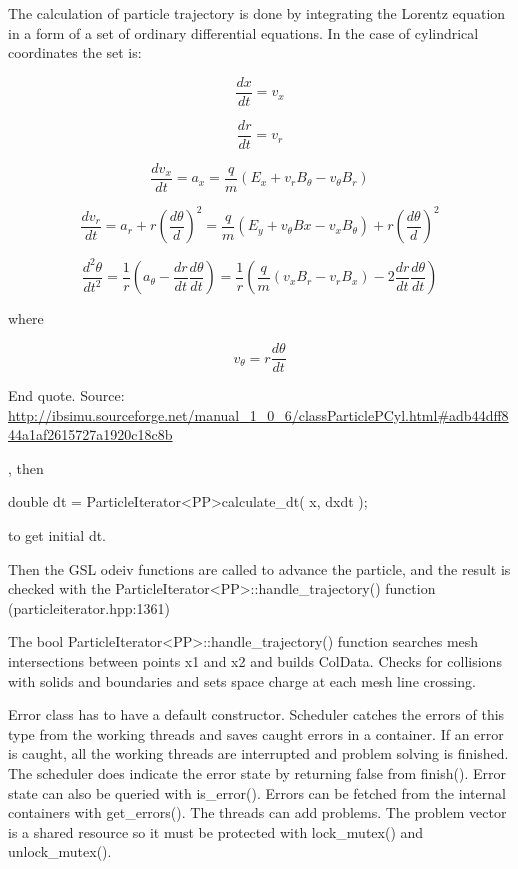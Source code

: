 \documentclass[12pt,a4paper]{article}
\begin{document}
The calculation of particle trajectory is done by integrating the Lorentz equation in a form of a set of ordinary differential equations. In the case of cylindrical coordinates the set is:

$$\frac{dx}{dt} = v_{x}$$

$$\frac{dr}{dt} = v_{r}$$

$$\frac{dv_{x}}{dt} = a_{x} = \frac{q}{m}(E_{x}+v_{r}B_{\theta}-v_{\theta}B_{r})$$

$$\frac{dv_{r}}{dt} = a_{r} + r\left ( \frac{d\theta}{d}\right )^{2} = \frac{q}{m}(E_{y}+v_{\theta}B{x}-v_{x}B_{\theta})+r\left ( \frac{d\theta}{d}\right )^{2}$$

$$\frac{d^{2}\theta}{dt^2} = \frac{1}{r}\left(a_{\theta}-\frac{dr}{dt}\frac{d\theta}{dt}\right) =
 \frac{1}{r}\left(\frac{q}{m}(v_{x}B_{r}-v_{r}B_{x}) -2\frac{dr}{dt}\frac{d\theta}{dt}\right)
$$

where 

$$v_{\theta} = r\frac{d\theta}{dt}$$

End quote. Source: \url{http://ibsimu.sourceforge.net/manual_1_0_6/classParticlePCyl.html#adb44dff844a1af2615727a1920c18c8b}


, then 

double dt = ParticleIterator<PP>calculate\_dt( x, dxdt );

to get initial dt.



Then the GSL odeiv functions are called to advance the particle, and the result is checked with the ParticleIterator<PP>::handle\_trajectory() function (particleiterator.hpp:1361)

The bool ParticleIterator<PP>::handle\_trajectory() function searches mesh intersections between points x1 and x2 and builds ColData. Checks for collisions with solids and boundaries and sets space charge at each mesh line crossing.


Error class has to have a default constructor. Scheduler catches
the errors of this type from the working threads and saves caught
errors in a container. If an error is caught, all the working
threads are interrupted and problem solving is finished. The
scheduler does indicate the error state by returning false from
finish(). Error state can also be queried with is\_error(). Errors
can be fetched from the internal containers with get\_errors().
The %
threads can add problems. The problem vector is a shared resource
so it must be protected with lock\_mutex() and unlock\_mutex().
\end{document}
